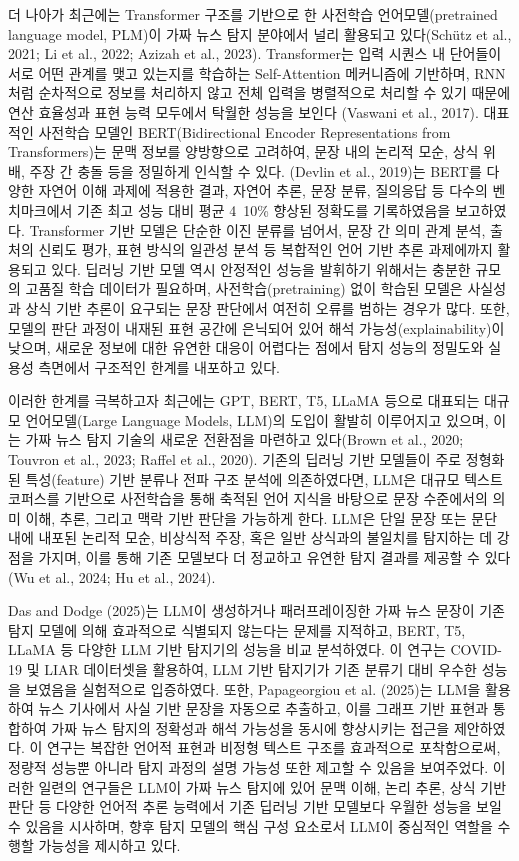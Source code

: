 \documentclass[a4paper,fleqn]{cas-sc}
\begin{document}
더 나아가 최근에는 Transformer 구조를 기반으로 한 사전학습 언어모델(pretrained language model, PLM)이 가짜 뉴스 탐지 분야에서 널리 활용되고 있다(Schütz et al., 2021; Li et al., 2022; Azizah et al., 2023). Transformer는 입력 시퀀스 내 단어들이 서로 어떤 관계를 맺고 있는지를 학습하는 Self-Attention 메커니즘에 기반하며, RNN처럼 순차적으로 정보를 처리하지 않고 전체 입력을 병렬적으로 처리할 수 있기 때문에 연산 효율성과 표현 능력 모두에서 탁월한 성능을 보인다 (Vaswani et al., 2017). 대표적인 사전학습 모델인 BERT(Bidirectional Encoder Representations from Transformers)는 문맥 정보를 양방향으로 고려하여, 문장 내의 논리적 모순, 상식 위배, 주장 간 충돌 등을 정밀하게 인식할 수 있다. (Devlin et al., 2019)는 BERT를 다양한 자연어 이해 과제에 적용한 결과, 자연어 추론, 문장 분류, 질의응답 등 다수의 벤치마크에서 기존 최고 성능 대비 평균 4~10\% 향상된 정확도를 기록하였음을 보고하였다. Transformer 기반 모델은 단순한 이진 분류를 넘어서, 문장 간 의미 관계 분석, 출처의 신뢰도 평가, 표현 방식의 일관성 분석 등 복합적인 언어 기반 추론 과제에까지 활용되고 있다.
딥러닝 기반 모델 역시 안정적인 성능을 발휘하기 위해서는 충분한 규모의 고품질 학습 데이터가 필요하며, 사전학습(pretraining) 없이 학습된 모델은 사실성과 상식 기반 추론이 요구되는 문장 판단에서 여전히 오류를 범하는 경우가 많다. 또한, 모델의 판단 과정이 내재된 표현 공간에 은닉되어 있어 해석 가능성(explainability)이 낮으며, 새로운 정보에 대한 유연한 대응이 어렵다는 점에서 탐지 성능의 정밀도와 실용성 측면에서 구조적인 한계를 내포하고 있다.

이러한 한계를 극복하고자 최근에는 GPT, BERT, T5, LLaMA 등으로 대표되는 대규모 언어모델(Large Language Models, LLM)의 도입이 활발히 이루어지고 있으며, 이는 가짜 뉴스 탐지 기술의 새로운 전환점을 마련하고 있다(Brown et al., 2020; Touvron et al., 2023; Raffel et al., 2020). 기존의 딥러닝 기반 모델들이 주로 정형화된 특성(feature) 기반 분류나 전파 구조 분석에 의존하였다면, LLM은 대규모 텍스트 코퍼스를 기반으로 사전학습을 통해 축적된 언어 지식을 바탕으로 문장 수준에서의 의미 이해, 추론, 그리고 맥락 기반 판단을 가능하게 한다.
LLM은 단일 문장 또는 문단 내에 내포된 논리적 모순, 비상식적 주장, 혹은 일반 상식과의 불일치를 탐지하는 데 강점을 가지며, 이를 통해 기존 모델보다 더 정교하고 유연한 탐지 결과를 제공할 수 있다(Wu et al., 2024; Hu et al., 2024). 

Das and Dodge (2025)는 LLM이 생성하거나 패러프레이징한 가짜 뉴스 문장이 기존 탐지 모델에 의해 효과적으로 식별되지 않는다는 문제를 지적하고, BERT, T5, LLaMA 등 다양한 LLM 기반 탐지기의 성능을 비교 분석하였다. 이 연구는 COVID-19 및 LIAR 데이터셋을 활용하여, LLM 기반 탐지기가 기존 분류기 대비 우수한 성능을 보였음을 실험적으로 입증하였다. 또한, Papageorgiou et al. (2025)는 LLM을 활용하여 뉴스 기사에서 사실 기반 문장을 자동으로 추출하고, 이를 그래프 기반 표현과 통합하여 가짜 뉴스 탐지의 정확성과 해석 가능성을 동시에 향상시키는 접근을 제안하였다. 이 연구는 복잡한 언어적 표현과 비정형 텍스트 구조를 효과적으로 포착함으로써, 정량적 성능뿐 아니라 탐지 과정의 설명 가능성 또한 제고할 수 있음을 보여주었다.
이러한 일련의 연구들은 LLM이 가짜 뉴스 탐지에 있어 문맥 이해, 논리 추론, 상식 기반 판단 등 다양한 언어적 추론 능력에서 기존 딥러닝 기반 모델보다 우월한 성능을 보일 수 있음을 시사하며, 향후 탐지 모델의 핵심 구성 요소로서 LLM이 중심적인 역할을 수행할 가능성을 제시하고 있다. 
\end{document}
